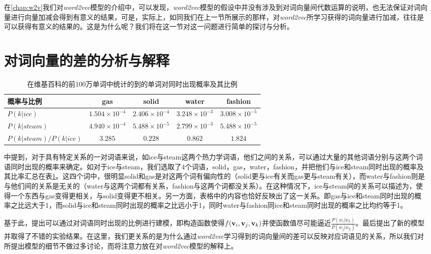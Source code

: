 在\ref{chap:w2v}我们对\emph{word2vec}模型的介绍中，可以发现，\emph{word2vec}模型的假设中并没有涉及到对词向量间代数运算的说明，也无法保证对词向量进行向量加减会得到有意义的结果，可是，实际上，如同我们在上一节所展示的那样，对\emph{word2vec}所学习获得的词向量进行加减，往往是可以获得有意义的结果的。这是为什么呢？我们将在这一节对这一问题进行简单的探讨与分析。

\section{对词向量的差的分析与解释}

\begin{longtable}{lcccc}
\caption[词语同时出现概率及比例]{在维基百科的前100万单词中统计的到的单词对同时出现概率及其比例} \label{tab:CoProbRatio} \\
\toprule[1.5pt]
概率与比例 & gas & solid & water & fashion\\
\midrule[1pt]
$P(k|ice)$	&$1.504\times10^{-4}$	&$2.406\times10^{-4}$	&$3.248\times10^{-3}$	&$3.008\times10^{-5}$	\\
$P(k|steam)$	&$4.940\times10^{-4}$	&$5.488\times10^{-5}$	&$2.799\times10^{-3}$	&$5.488\times10^{-5}$	\\
$P(k|steam)/P(k|ice)$	&$3.285$	&$0.228$	&$0.862$	&$1.824$	\\
\endfirsthead

\end{longtable}

\cite{pennington2014glove}中提到，对于具有特定关系的一对词语来说，如ice与steam这两个热力学词语，他们之间的关系，可以通过大量的其他词语分别与这两个词语同时出现的概率来确定。如对于ice与steam，我们选取了4个词语，solid，gas，water，fashion，并把他们与ice和steam同时出现的概率及其比率汇总在表\ref{tab:CoProbRatio}。这四个词中，很明显solid和gas是对这两个词有偏向性的（solid更与ice有关而gas更与steam有关），而water与fashion则是与他们间的关系是无关的（water与这两个词都有关系，fashion与这两个词都没关系）。在这种情况下，ice与steam间的关系可以描述为，使得一个东西与gas变得更相关，与solid变得更不相关。另一方面，表格中的内容也恰好反映出了这一关系。即gas与ice和steam同时出现的概率之比远大于1，而solid与ice和steam同时出现的概率之比远小于1，同时water与fashion同ice和steam同时出现的概率之比均约等于1。

基于此，\cite{pennington2014glove}提出可以通过对词语同时出现的比例进行建模，即构造函数使得$f({{\mathbf v}}_i, {{\mathbf v}}_j, {{\mathbf v}}_k)$并使函数值尽可能逼近$\frac{P(w_i|w_k)}{P(w_j|w_k)}$。最后提出了新的模型并取得了不错的实验结果。在这里，我们更关系的是为什么通过\emph{word2vec}学习得到的词向量间的差可以反映对应词语见的关系，所以我们对\citep{pennington2014glove}所提出模型的细节不做过多讨论，而将注意力放在对\emph{word2vec}模型的解释上。

